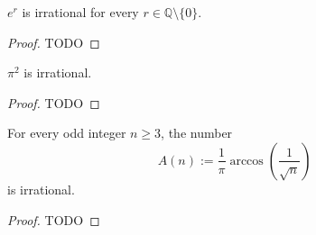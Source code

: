 \begin{theorem}
  \label{e_pow_irrational}
  \label{book.irrational.Theorem_1}
  \leanok
  \(e^r\) is irrational for every \(r\in\mathbb{Q}\setminus\{0\}\).
\end{theorem}
\begin{proof}
  TODO
\end{proof}


\begin{theorem}
  \label{pi_pow_2_irrational}
  \label{book.irrational.Theorem_2}
  \leanok
  \(\pi^2\) is irrational.
\end{theorem}
\begin{proof}
  TODO
\end{proof}

\begin{theorem}
  \label{arccos_irrational}
  \label{book.irrational.Theorem_3}
  \leanok
  For every odd integer \(n \ge 3\), the number
  \[
  A(n) := \frac{1}{\pi}\arccos\left(\frac{1}{\sqrt{n}}\right)
  \]
  is irrational.
\end{theorem}
\begin{proof}
  TODO
\end{proof}

